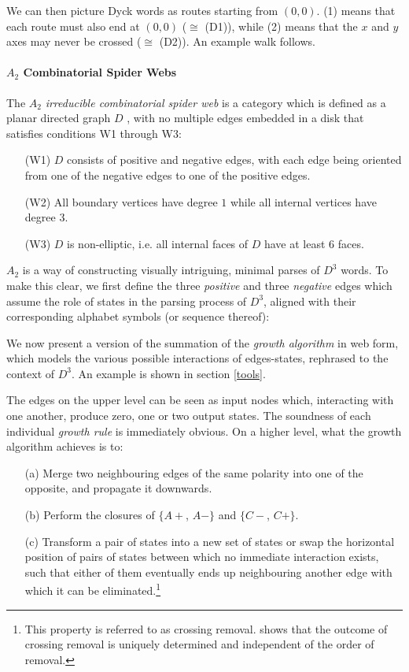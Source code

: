 \documentclass[nonatbib,numbers,10pt]{llncs}
\begin{document}
We can then picture Dyck words as routes starting from $(0,0)$. (1) means that each route must also end at $(0,0)$ ($\cong$ (D1)), while (2) means that the $x$ and $y$ axes may never be crossed ($\cong$ (D2)). An example walk follows.

\paragraph{$A_2$ Combinatorial Spider Webs}
The $A_2$ \textit{irreducible combinatorial spider web} is a category which is defined as a planar directed graph $D$ \cite{petersen}, with no multiple edges embedded in a disk that satisfies conditions W1 through W3:
\begin{enumerate}
\item[(W1)] $D$ consists of positive and negative edges, with each edge being oriented from one of the negative edges to one of the positive edges.
\item[(W2)] All boundary vertices have degree $1$ while all internal vertices have degree $3$.
\item[(W3)] $D$ is non-elliptic, i.e. all internal faces of $D$ have at least $6$ faces.
\end{enumerate}

$A_2$ is a way of constructing visually intriguing, minimal parses of $D^3$ words. To make this clear, we first define the three \textit{positive} and three \textit{negative} edges which assume the role of states in the parsing process of $D^3$, aligned with their corresponding alphabet symbols (or sequence thereof):

We now present a version of the summation of the \textit{growth algorithm} \cite{petersen} in web form, which models the various possible interactions of edges-states, rephrased to the context of $D^3$. An example is shown in section \ref{tools}.

The edges on the upper level can be seen as input nodes which, interacting with one another, produce zero, one or two output states. The soundness of each individual \textit{growth rule} is immediately obvious. On a higher level, what the growth algorithm achieves is to:
\begin{enumerate}
\item[(a)] Merge two neighbouring edges of the same polarity into one of the opposite, and propagate it downwards.
\item[(b)] Perform the closures of $\{A+$, $A-\}$ and $\{C-$, $C+\}$.
\item[(c)] Transform a pair of states into a new set of states or swap the horizontal position of pairs of states between which no immediate interaction exists, such that either of them eventually ends up neighbouring another edge with which it can be eliminated.\footnote{This property is referred to as crossing removal. \cite{petersen} shows that the outcome of crossing removal is uniquely determined and independent of the order of removal.}
\end{enumerate}
\end{document}
